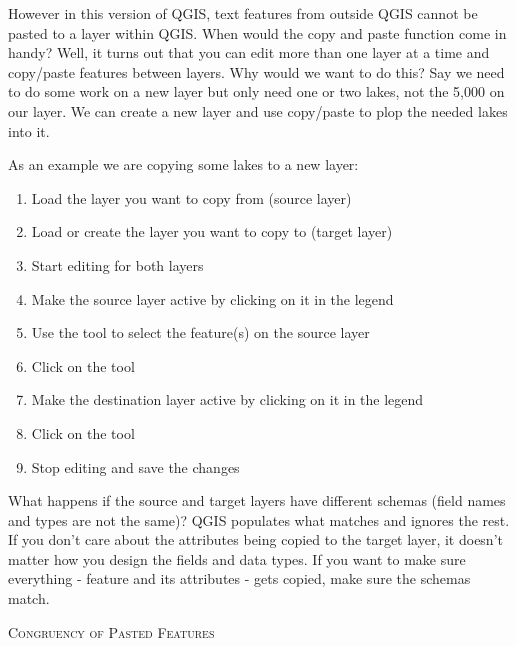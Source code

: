 However in this version of QGIS, text features from outside QGIS cannot 
be pasted to a layer within QGIS. When would the copy and paste function 
come in handy? Well, it turns out that you can edit more than one layer 
at a time and copy/paste features between layers. Why would we want to do 
this?  Say we need to do some work on a new layer but only need one or 
two lakes, not the 5,000 on our  layer. We can create 
a new layer and use copy/paste to plop the needed lakes into it. 

As an example we are copying some lakes to a new layer:

\begin{enumerate}
\item Load the layer you want to copy from (source layer)
\item Load or create the layer you want to copy to (target layer) 
\item Start editing for both layers 
\item Make the source layer active by clicking on it in the legend 
\item Use the  tool to select the feature(s) on the source layer
\item Click on the  tool
\item Make the destination layer active by clicking on it in the legend 
\item Click on the  tool 
\item Stop editing and save the changes
\end{enumerate}

What happens if the source and target layers have
different schemas (field names and types are not the same)? QGIS populates
what matches and ignores the rest. If you don't care about the attributes
being copied to the target layer, it doesn't matter how you design the
fields and data types. If you want to make sure everything - feature and its
attributes - gets copied, make sure the schemas match.

\begin{Tip}[ht]\caption{\textsc{Congruency of Pasted Features}}
\end{Tip}

